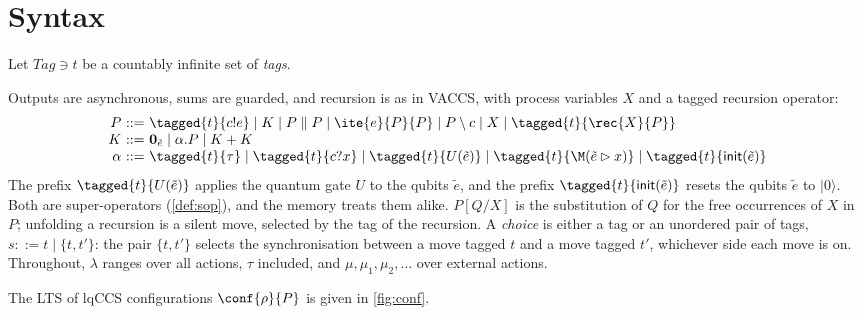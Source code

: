 \section{Syntax}

Let $\mathit{Tag} \ni t$ be a countably infinite set of \emph{tags}.

Outputs are asynchronous, sums are guarded, and recursion is as in VACCS, with
process variables $X$ and a tagged recursion operator:
\[
\begin{array}{r@{\ ::=\ }l}
P & \tagged{t}{c!e} \mid K \mid P \parallel P \mid \ite{e}{P}{P} \mid P \setminus c
    \mid X \mid \tagged{t}{\rec{X}{P}}\\
K & \mathbf{0}_{\tilde e} \mid \alpha.P \mid K + K\\
\alpha & \tagged{t}{\tau} \mid \tagged{t}{c?x} \mid
        \tagged{t}{U(\tilde e)} \mid \tagged{t}{\M(\tilde e \rhd x)}
        \mid \tagged{t}{\mathsf{init}(\tilde e)}
\end{array}
\]
The prefix $\tagged{t}{U(\tilde e)}$ applies the quantum gate $U$ to the
qubits $\tilde e$, and the prefix $\tagged{t}{\mathsf{init}(\tilde e)}$ resets
the qubits $\tilde e$ to $|0\rangle$. Both are super-operators
(\cref{def:sop}), and the memory treats them alike.
$P[Q/X]$ is the substitution of $Q$ for the free occurrences of $X$ in $P$;
unfolding a recursion is a silent move, selected by the tag of the recursion.
A \emph{choice} is either a tag or an unordered pair of tags,
$s ::= t \mid \{t,t'\}$: the pair $\{t,t'\}$ selects the synchronisation
between a move tagged $t$ and a move tagged $t'$, whichever side each move is
on. Throughout, $\lambda$ ranges over all
actions, $\tau$ included, and $\mu, \mu_1, \mu_2, \ldots$ over external actions.

The LTS of lqCCS configurations $\conf{\rho}{P}$ is given in \cref{fig:conf}.


